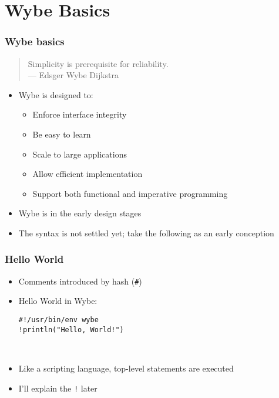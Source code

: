 \documentclass[12pt]{beamer}
\begin{document}
\section{Wybe Basics}

\begin{frame}
\frametitle{Wybe basics}
\begin{quotation}
Simplicity is prerequisite for reliability. \\
\hspace*{3em}--- Edsger Wybe Dijkstra
\end{quotation}

\begin{itemize}
\item Wybe is designed to:
  \begin{itemize}
  \item Enforce interface integrity
  \item Be easy to learn
  \item Scale to large applications
  \item Allow efficient implementation
  \item Support both functional and imperative programming
  \end{itemize}
\item Wybe is in the early design stages
\item The syntax is not settled yet; take the following as an early conception
\end{itemize}
\end{frame}


\begin{frame}
\frametitle{Hello World}
\begin{itemize}
\item Comments introduced by hash (\texttt{\#})
\item Hello World in Wybe: \\[3ex]
\begin{alltt}
    \hspace*{5em}\texttt{\#!/usr/bin/env wybe}\\
    \hspace*{5em}\texttt{!println("Hello, World!")}
\end{alltt} \\[3ex]
\item Like a scripting language, top-level statements are executed
\item I'll explain the \texttt{!} later
\end{itemize}
\end{frame}
\end{document}
